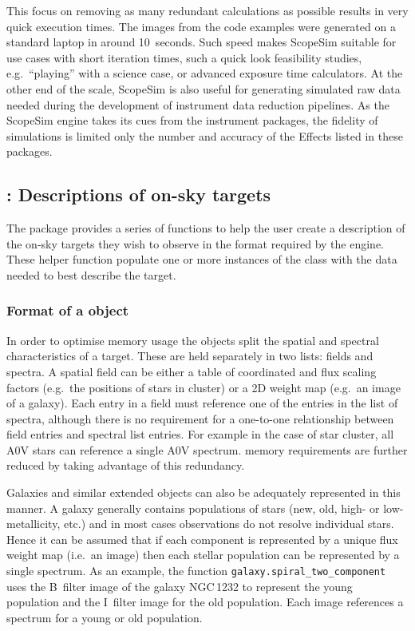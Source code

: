 This focus on removing as many redundant calculations as possible results in very quick execution times.
The images from the code examples were generated on a standard laptop in around 10~seconds.
Such speed makes ScopeSim suitable for use cases with short iteration times, such a quick look feasibility studies, e.g.~``playing'' with a science case, or advanced exposure time calculators.
At the other end of the scale, ScopeSim is also useful for generating simulated raw data needed during the development of instrument data reduction pipelines.
As the ScopeSim engine takes its cues from the instrument packages, the fidelity of simulations is limited only the number and accuracy of the Effects listed in these packages.


\subsection{\ScopeSimtemplates{}: Descriptions of on-sky targets}
\label{scopesim-templates-descriptions-of-on-sky-targets}

The \scopesimtemplates{} package provides a series of functions to help the user create a description of the on-sky targets they wish to observe in the format required by the \ScopeSim{} engine.
These helper function populate one or more instances of the \ScopeSim{} \Source{} class with the data needed to best describe the target.


\subsubsection{Format of a \Source{} object}
\label{format-of-a-source-object}

In order to optimise memory usage the \Source{} objects split the spatial and spectral characteristics of a target.\cite{schmalzl2012}
These are held separately in two lists: fields and spectra.
A spatial field can be either a table of coordinated and flux scaling factors (e.g.~the positions of stars in cluster) or a 2D weight map (e.g.~an image of a galaxy).
Each entry in a field must reference one of the entries in the list of spectra, although there is no requirement for a one-to-one relationship between field entries and spectral list entries.
For example in the case of star cluster, all A0V stars can reference a single A0V spectrum.
\ScopeSim{} memory requirements are further reduced by taking advantage of this redundancy.

Galaxies and similar extended objects can also be adequately represented in this manner.
A galaxy generally contains populations of stars (new, old, high- or low-metallicity, etc.) and in most cases observations do not resolve individual stars.
Hence it can be assumed that if each component is represented by a unique flux weight map (i.e.~an image) then each stellar population can be represented by a single spectrum.
As an example, the \scopesimtemplates{} function \lstinline{galaxy.spiral_two_component} uses the B~filter image of the galaxy NGC\,1232 to represent the young population and the I~filter image for the old population.
Each image references a spectrum for a young or old population.

